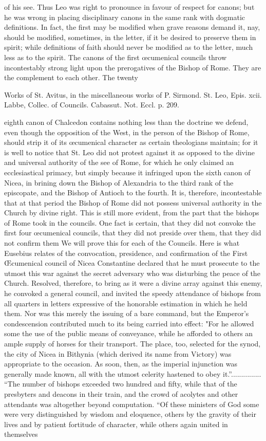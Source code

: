 of his see. Thus Leo was right to pronounce in favour of respect for canons; but he was wrong in placing disciplinary canons in the same rank with dogmatic definitions. In fact, the first may be modified when grave reasons demand it, nay, should be modified, sometimes, in the letter, if it be desired to preserve them in spirit; while definitions of faith should never be modified as to the letter, much less as to the spirit. The canons of the first œcumenical councils throw incontestably strong light upon the prerogatives of the Bishop of Rome. They are the complement to each other. The twenty

Works of St. Avitus, in the miscellaneous works of P. Sirmond. St. Leo, Epis. xcii. Labbe, Collec. of Councils. Cabassut. Not. Eccl. p. 209.

eighth canon of Chalcedon contains nothing less than the doctrine we defend, even though the opposition of the West, in the person of the Bishop of Rome, should strip it of its œcumenical character as certain theologians maintain; for it is well to notice that St. Leo did not protest against it as opposed to the divine and universal authority of the see of Rome, for which he only claimed an ecclesiastical primacy, but simply because it infringed upon the sixth canon of Nicea, in brining down the Bishop of Alexandria to the third rank of the episcopate, and the Bishop of Antioch to the fourth. It is, therefore, incontestable that at that period the Bishop of Rome did not possess universal authority in the Church by divine right. This is still more evident, from the part that the bishops of Rome took in the councils. One fact is certain, that they did not convoke the first four œcumenical councils, that they did not preside over them, that they did not confirm them We will prove this for each of the Councils. Here is what Eusebius relates of the convocation, presidence, and confirmation of the First Œcumenical council of Nicea Constantine declared that he must prosecute to the utmost this war against the secret adversary who was disturbing the peace of the Church. Resolved, therefore, to bring as it were a divine array against this enemy, he convoked a general council, and invited the speedy attendance of bishops from all quarters in letters expressive of the honorable estimation in which he held them. Nor was this merely the issuing of a bare command, but the Emperor’s condescension contributed much to its being carried into effect: "For he allowed some the use of the public means of conveyance, while he afforded to others an ample supply of horses for their transport. The place, too, selected for the synod, the city of Nicea in Bithynia (which derived its name from Victory) was appropriate to the occasion. As soon, then, as the imperial injunction was generally made known, all with the utmost celerity hastened to obey it.”............... “The number of bishops exceeded two hundred and fifty, while that of the presbyters and deacons in their train, and the crowd of acolytes and other attendants was altogether beyond computation. “Of these ministers of God some were very distinguished by wisdom and eloquence, others by the gravity of their lives and by patient fortitude of character, while others again united in themselves 